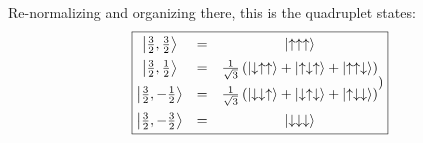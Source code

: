 \documentclass[12pt]{article}
\begin{document}
\begin{enumerate}[label=\alph*)]
Re-normalizing and organizing there, this is the quadruplet states: 
\[\boxed{\mqty{\ket{\frac{3}{2}, \frac{3}{2}} & = & \ket{\uparrow\uparrow\uparrow}\vspace{0.5em}\\ \ket{\frac{3}{2}, \frac{1}{2}} & = & \frac{1}{\sqrt{3}}\left(\ket{\downarrow\uparrow\uparrow} + \ket{\uparrow\downarrow\uparrow} + \ket{\uparrow\uparrow\downarrow}\right)\vspace{0.5em}\\ \ket{\frac{3}{2}, -\frac{1}{2}} & = & \frac{1}{\sqrt{3}}\left(\ket{\downarrow\downarrow\uparrow} + \ket{\downarrow\uparrow\downarrow} + \ket{\uparrow\downarrow\downarrow}\right)\vspace{0.5em}\\ \ket{\frac{3}{2}, -\frac{3}{2}} & = & \ket{\downarrow\downarrow\downarrow}})}\]


\end{enumerate}
\end{document}
